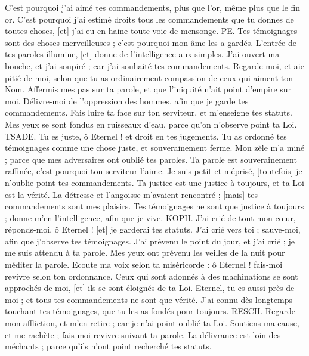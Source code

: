 \begin{multicols}{2}
C'est pourquoi j'ai aimé tes commandements, plus que l'or, même plus que le fin or.
C'est pourquoi j'ai estimé droits tous les commandements que tu donnes de toutes choses, [et] j'ai eu en haine toute voie de mensonge.
PE. Tes témoignages sont des choses merveilleuses ; c'est pourquoi mon âme les a gardés.
L'entrée de tes paroles illumine, [et] donne de l'intelligence aux simples.
J'ai ouvert ma bouche, et j'ai soupiré ; car j'ai souhaité tes commandements.
Regarde-moi, et aie pitié de moi, selon que tu as ordinairement compassion de ceux qui aiment ton Nom.
Affermis mes pas sur ta parole, et que l'iniquité n'ait point d'empire sur moi.
Délivre-moi de l'oppression des hommes, afin que je garde tes commandements.
Fais luire ta face sur ton serviteur, et m'enseigne tes statuts.
Mes yeux se sont fondus en ruisseaux d'eau, parce qu'on n'observe point ta Loi.
TSADE. Tu es juste, ô Eternel ! et droit en tes jugements.
Tu as ordonné tes témoignages comme une chose juste, et souverainement ferme.
Mon zèle m'a miné ; parce que mes adversaires ont oublié tes paroles.
Ta parole est souverainement raffinée, c'est pourquoi ton serviteur l'aime.
Je suis petit et méprisé, [toutefois] je n'oublie point tes commandements.
Ta justice est une justice à toujours, et ta Loi est la vérité.
La détresse et l'angoisse m'avaient rencontré ; [mais] tes commandements sont mes plaisirs.
Tes témoignages ne sont que justice à toujours ; donne m'en l’intelligence, afin que je vive.
KOPH. J'ai crié de tout mon cœur, réponds-moi, ô Eternel ! [et] je garderai tes statuts.
J'ai crié vers toi ; sauve-moi, afin que j'observe tes témoignages.
J'ai prévenu le point du jour, et j'ai crié ; je me suis attendu à ta parole.
Mes yeux ont prévenu les veilles de la nuit pour méditer la parole.
Ecoute ma voix selon ta miséricorde : ô Eternel ! fais-moi revivre selon ton ordonnance.
Ceux qui sont adonnés à des machinations se sont approchés de moi, [et] ils se sont éloignés de ta Loi.
Eternel, tu es aussi près de moi ; et tous tes commandements ne sont que vérité.
J'ai connu dès longtemps touchant tes témoignages, que tu les as fondés pour toujours.
RESCH. Regarde mon affliction, et m'en retire ; car je n'ai point oublié ta Loi.
Soutiens ma cause, et me rachète ; fais-moi revivre suivant ta parole.
La délivrance est loin des méchants ; parce qu'ils n'ont point recherché tes statuts.

\end{multicols}
